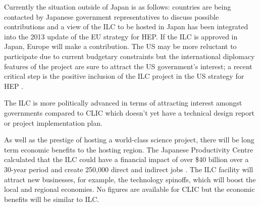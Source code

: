 Currently the situation outside of Japan is as follows: countries are being contacted by Japanese government representatives to discuss possible contributions and a view of the ILC to be hosted in Japan has been integrated into the 2013 update of the EU strategy for HEP. If the ILC is approved in Japan, Europe will make a contribution. The US may be more reluctant to participate due to current budgetary constraints but the international diplomacy features of the project are sure to attract the US government's interest; a recent critical step is the positive inclusion of the ILC project in the US strategy for HEP \cite{Funding:NaturePress1, LCC:Press5}.
 
The ILC is more politically advanced in terms of attracting interest amongst governments compared to CLIC which doesn't yet have a technical design report or project implementation plan.
 
As well as the prestige of hosting a world-class science project, there will be long term economic benefits to the hosting region. The Japanese Productivity Centre calculated that the ILC could have a financial impact of over \$40 billion over a 30-year period and create 250,000 direct and indirect jobs \cite{Funding:SwissInfo}. The ILC facility will attract new businesses, for example, the technology spinoffs, which will boost the local and regional economies. No figures are available for CLIC but the economic benefits will be similar to ILC.
